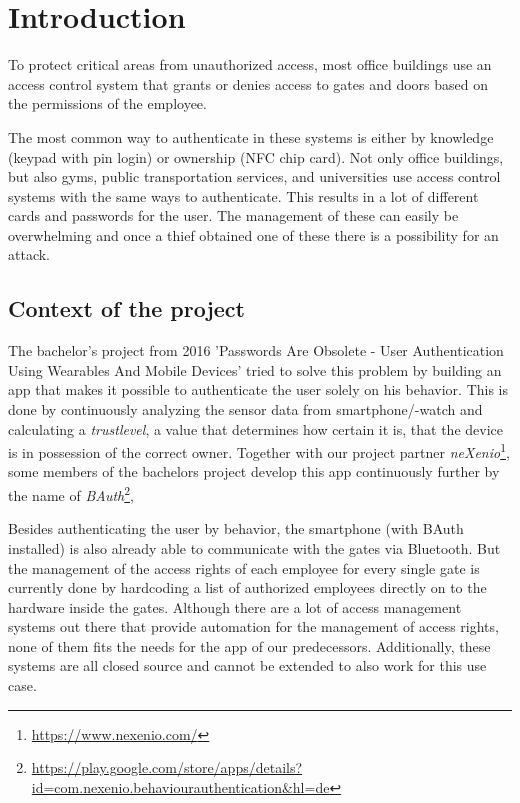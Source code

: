 \section{Introduction}

To protect critical areas from unauthorized access, most office buildings use an access control system that grants or denies access to gates and doors based on the permissions of the employee.

The most common way to authenticate in these systems is either by knowledge (keypad with pin login) or ownership (NFC chip card).
Not only office buildings, but also gyms, public transportation services, and universities use access control systems with the same ways to authenticate. This results in a lot of different cards and passwords for the user. The management of these can easily be overwhelming and once a thief obtained one of these there is a possibility for an attack.

\subsection{Context of the project}
\label{Context of the project}

The bachelor's project from 2016 'Passwords Are Obsolete - User Authentication Using Wearables And Mobile Devices' tried to solve this problem by building an app that makes it possible to authenticate the user solely on his behavior. This is done by continuously analyzing the sensor data from smartphone/-watch and calculating a \emph{trustlevel}, a value that determines how certain it is, that the device is in possession of the correct owner.
Together with our project partner \emph{neXenio}\footnote{\url{https://www.nexenio.com/}}, some members of the bachelors project develop this app continuously further by the name of \emph{BAuth}\footnote{\url{https://play.google.com/store/apps/details?id=com.nexenio.behaviourauthentication&hl=de}}, 

Besides authenticating the user by behavior, the smartphone (with BAuth installed) is also already able to communicate with the gates via Bluetooth. But the management of the access rights of each employee for every single gate is currently done by hardcoding a list of authorized employees directly on to the hardware inside the gates. Although there are a lot of access management systems out there that provide automation for the management of access rights, none of them fits the needs for the app of our predecessors. Additionally, these systems are all closed source and cannot be extended to also work for this use case. 


